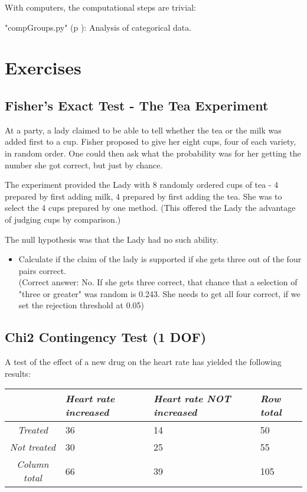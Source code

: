 With computers, the computational steps are trivial:

\PyImg "compGroups.py" (p \pageref{py:compGroups}): Analysis of categorical data.

\section{Exercises}

\subsection{Fisher's Exact Test - The Tea Experiment}

At a party, a lady claimed to be able to tell whether the tea or the milk was added first to a cup. Fisher proposed to give her eight cups, four of each variety, in random order. One could then ask what the probability was for her getting the number she got correct, but just by chance.

The experiment provided the Lady with 8 randomly ordered cups of tea - 4 prepared by first adding milk, 4 prepared by first adding the tea. She was to select the 4 cups prepared by one method. (This offered the Lady the advantage of judging cups by comparison.)

The null hypothesis was that the Lady had no such ability.

\begin{itemize}
  \item Calculate if the claim of the lady is supported if she gets three out of the four pairs correct.\\
  (Correct answer: No. If she gets three correct, that chance that a selection of "three or greater" was random is 0.243. She needs to get all four correct, if we set the rejection threshold at 0.05)

\end{itemize}


\subsection{Chi2 Contingency Test (1 DOF)}

A test of the effect of a new drug on the heart rate has yielded the following results:

\begin{table}[h]
  \centering
  \begin{tabular}{|c|l l | l|}
  \hline
  & \emph{Heart rate increased} & \emph{Heart rate NOT increased} & \emph{Row total} \\
  \hline
  \emph{Treated} & 36 & 14 & 50 \\
  \emph{Not treated} & 30 & 25 & 55 \\
  \hline
  \emph{Column total} & 66 & 39 & 105 \\
  \hline
  \end{tabular}
\end{table}

